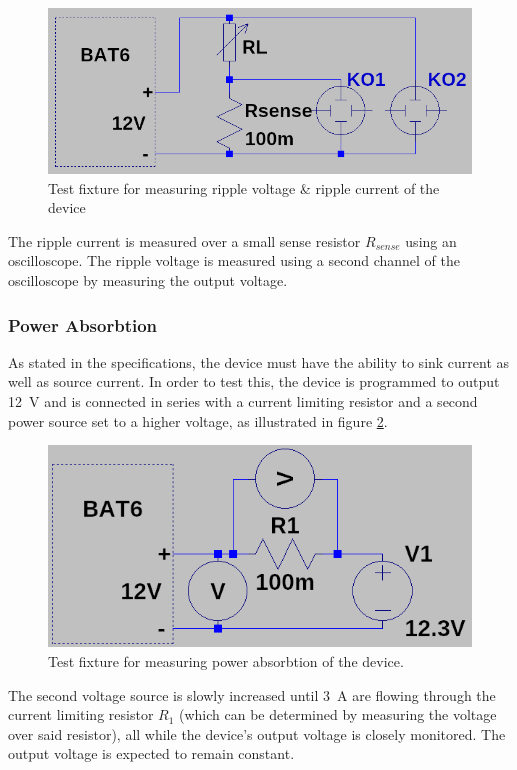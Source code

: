 \begin{figure}[th!]
    \centering
    \includegraphics[width=.6\textwidth]{images/sim/ripple-fixture.png}
    \caption{Test fixture for measuring ripple voltage \& ripple current of the device}
    \label{fig:verification:ripple_fix}
\end{figure}

The ripple current  is measured over a small sense resistor $R_{sense}$ using an
oscilloscope. The ripple voltage  is  measured  using  a  second  channel of the
oscilloscope by measuring the output voltage.


\subsubsection{Power Absorbtion}

As stated in the specifications,  the  device  must  have  the  ability  to sink
current  as  well  as  source  current.  In  order to test this, the  device  is
programmed  to  output  \SI{12}{\volt} and is connected in series with a current
limiting resistor  and  a  second  power  source  set  to  a  higher voltage, as
illustrated      in      figure     \ref{fig:verification:power_absorbtion_fix}.

\begin{figure}[th!]
    \centering
    \includegraphics[width=.6\textwidth]{images/sim/power-absorbtion-fixture.png}
    \caption{Test fixture for measuring power absorbtion of the device.}
    \label{fig:verification:power_absorbtion_fix}
\end{figure}

The second voltage source is slowly increased until \SI{3}{\ampere} are  flowing
through  the  current  limiting  resistor  $R_1$  (which  can  be determined  by
measuring the voltage over said resistor), all while the device's output voltage
is closely monitored. The output voltage is expected to remain constant.


